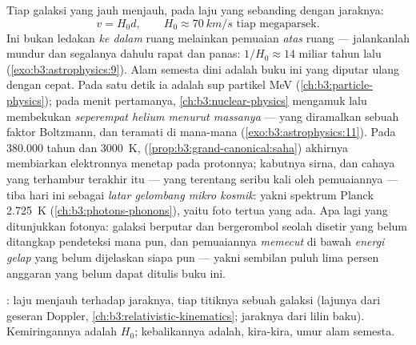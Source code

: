 \begin{definition}\label{def:b3:astrophysics:hubble}
Tiap galaksi yang jauh menjauh, pada laju yang sebanding dengan jaraknya:
\[
v = H_0d , \qquad H_0 \approx \qty{70}{km/s}
\text{ tiap megaparsek} .
\]
Ini bukan ledakan \emph{ke dalam} ruang melainkan pemuaian
\emph{atas} ruang --- jalankanlah mundur dan segalanya dahulu
rapat dan panas: $1/H_0 \approx 14$ miliar tahun lalu
(\cref{exo:b3:astrophysics:9}). Alam semesta dini adalah buku ini
yang diputar ulang dengan cepat. Pada satu detik ia adalah sup partikel \unit{MeV}
(\cref{ch:b3:particle-physics}); pada menit pertamanya,
\cref{ch:b3:nuclear-physics} mengamuk lalu membekukan
\emph{seperempat helium menurut massanya} --- yang diramalkan sebuah faktor
Boltzmann, dan teramati di mana-mana
(\cref{exo:b3:astrophysics:11}). Pada 380.000 tahun dan
\qty{3000}{K}, 
(\cref{prop:b3:grand-canonical:saha}) akhirnya membiarkan elektronnya menetap
pada protonnya; kabutnya sirna, dan cahaya yang terhambur terakhir itu ---
yang terentang seribu kali oleh pemuaiannya --- tiba hari ini sebagai
\emph{latar gelombang mikro kosmik}: yakni spektrum Planck \qty{2.725}{K}
(\cref{ch:b3:photons-phonons}), yaitu foto tertua
yang ada. Apa lagi yang ditunjukkan fotonya: galaksi berputar dan bergerombol
seolah disetir \emph{} yang belum ditangkap pendeteksi mana pun, dan
pemuaiannya \emph{memecut} di bawah \emph{energi gelap} yang
belum dijelaskan siapa pun --- yakni sembilan puluh lima persen anggaran
yang belum dapat ditulis buku ini.
\end{definition}

\begin{omfigure}

{\small {}: laju menjauh terhadap jaraknya, tiap titiknya
sebuah galaksi (lajunya dari geseran Doppler,
\cref{ch:b3:relativistic-kinematics}; jaraknya dari lilin
baku). Kemiringannya adalah $H_0$; kebalikannya adalah, kira-kira, umur
alam semesta.}
\end{omfigure}

